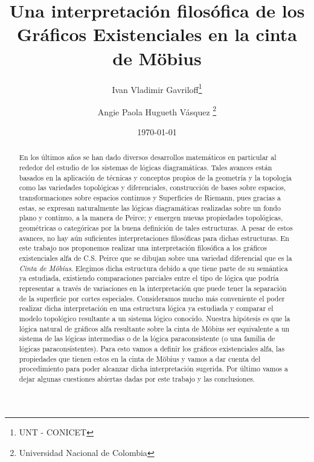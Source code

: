 \documentclass[
	fontsize=10pt, %
	twoside=false, %
	secnumdepth=1, %
	abstract=true, %
]{kaohandt}
\begin{document}

\title[Una interpretación filosófica de los Gráficos Existenciales en la cinta de Möbius]{Una interpretación filosófica de los Gráficos Existenciales en la cinta de Möbius}

\author[IVG, APHV]{Ivan Vladimir Gavriloff\thanks{UNT - CONICET} \and Angie Paola Hugueth Vásquez \thanks{Universidad Nacional de Colombia}}

\date{\today}


\maketitle

\margintoc

\begin{abstract}
	\noindent
	En los últimos años se han dado diversos desarrollos matemáticos en particular al rededor del estudio de los sistemas de lógicas diagramáticas. Tales avances están basados en la aplicación de técnicas y conceptos propios de la geometría y la topología como las variedades topológicas y diferenciales, construcción de bases sobre espacios, transformaciones sobre espacios continuos y Superficies de Riemann, pues gracias a estas, se expresan naturalmente las lógicas diagramáticas realizadas sobre un fondo plano y continuo, a la manera de Peirce; y emergen nuevas propiedades topológicas, geométricas o categóricas por la buena definición de tales estructuras. A pesar de estos avances, no hay aún suficientes interpretaciones filosóficas para dichas estructuras.
	En este trabajo nos proponemos realizar una interpretación filosófica a los gráficos existenciales alfa de C.S. Peirce que se dibujan sobre una variedad diferencial que es la \textit{Cinta de Möbius}. Elegimos dicha estructura debido a que tiene parte de su semántica ya estudiada, existiendo comparaciones parciales entre el tipo de lógica que podría representar a través de variaciones en la interpretación que puede tener la separación de la superficie por cortes especiales. Consideramos mucho más conveniente el poder realizar dicha interpretación en una estructura lógica ya estudiada y comparar el modelo topológico resultante a un sistema lógico conocido. Nuestra hipótesis es que la lógica natural de gráficos alfa resultante sobre la cinta de Möbius ser equivalente a un sistema de las lógicas intermedias o de la lógica paraconsistente (o una familia de lógicas paraconsistentes). Para esto vamos a definir los gráficos existenciales alfa, las propiedades que tienen estos en la cinta de Möbius y vamos a dar cuenta del procedimiento para poder alcanzar dicha interpretación sugerida. Por último vamos a dejar algunas cuestiones abiertas dadas por este trabajo y las conclusiones.
\end{abstract}
\end{document}
